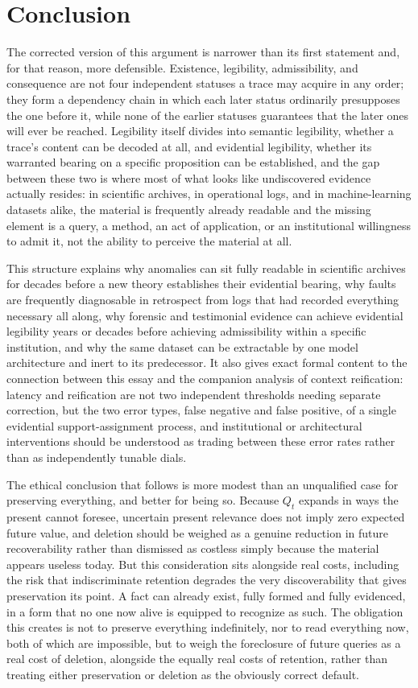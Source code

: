 \documentclass[11pt]{article}
\begin{document}
\section{Conclusion}

The corrected version of this argument is narrower than its first statement and, for that reason, more defensible. Existence, legibility, admissibility, and consequence are not four independent statuses a trace may acquire in any order; they form a dependency chain in which each later status ordinarily presupposes the one before it, while none of the earlier statuses guarantees that the later ones will ever be reached. Legibility itself divides into semantic legibility, whether a trace's content can be decoded at all, and evidential legibility, whether its warranted bearing on a specific proposition can be established, and the gap between these two is where most of what looks like undiscovered evidence actually resides: in scientific archives, in operational logs, and in machine-learning datasets alike, the material is frequently already readable and the missing element is a query, a method, an act of application, or an institutional willingness to admit it, not the ability to perceive the material at all.

This structure explains why anomalies can sit fully readable in scientific archives for decades before a new theory establishes their evidential bearing, why faults are frequently diagnosable in retrospect from logs that had recorded everything necessary all along, why forensic and testimonial evidence can achieve evidential legibility years or decades before achieving admissibility within a specific institution, and why the same dataset can be extractable by one model architecture and inert to its predecessor. It also gives exact formal content to the connection between this essay and the companion analysis of context reification: latency and reification are not two independent thresholds needing separate correction, but the two error types, false negative and false positive, of a single evidential support-assignment process, and institutional or architectural interventions should be understood as trading between these error rates rather than as independently tunable dials.

The ethical conclusion that follows is more modest than an unqualified case for preserving everything, and better for being so. Because $Q_t$ expands in ways the present cannot foresee, uncertain present relevance does not imply zero expected future value, and deletion should be weighed as a genuine reduction in future recoverability rather than dismissed as costless simply because the material appears useless today. But this consideration sits alongside real costs, including the risk that indiscriminate retention degrades the very discoverability that gives preservation its point. A fact can already exist, fully formed and fully evidenced, in a form that no one now alive is equipped to recognize as such. The obligation this creates is not to preserve everything indefinitely, nor to read everything now, both of which are impossible, but to weigh the foreclosure of future queries as a real cost of deletion, alongside the equally real costs of retention, rather than treating either preservation or deletion as the obviously correct default.
\end{document}
